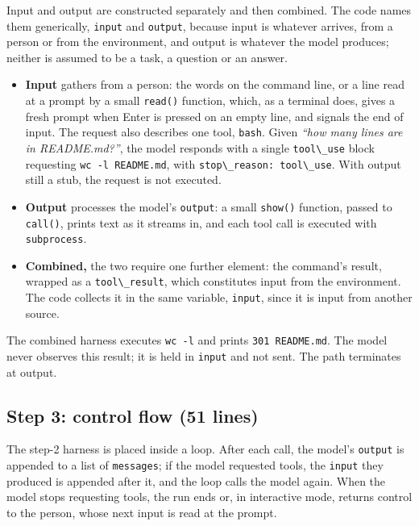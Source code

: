 Input and output are constructed separately and then combined. The code names them generically, \passthrough{\lstinline!input!} and \passthrough{\lstinline!output!}, because input is whatever arrives, from a person or from the environment, and output is whatever the model produces; neither is assumed to be a task, a question or an answer.

\begin{itemize}
\tightlist
\item
  \textbf{Input} gathers from a person: the words on the command line, or a line read at a prompt by a small \passthrough{\lstinline!read()!} function, which, as a terminal does, gives a fresh prompt when Enter is pressed on an empty line, and signals the end of input. The request also describes one tool, \passthrough{\lstinline!bash!}. Given \emph{``how many lines are in README.md?''}, the model responds with a single \passthrough{\lstinline!tool\_use!} block requesting \passthrough{\lstinline!wc -l README.md!}, with \passthrough{\lstinline!stop\_reason: tool\_use!}. With output still a stub, the request is not executed.
\item
  \textbf{Output} processes the model's \passthrough{\lstinline!output!}: a small \passthrough{\lstinline!show()!} function, passed to \passthrough{\lstinline!call()!}, prints text as it streams in, and each tool call is executed with \passthrough{\lstinline!subprocess!}.
\item
  \textbf{Combined,} the two require one further element: the command's result, wrapped as a \passthrough{\lstinline!tool\_result!}, which constitutes input from the environment. The code collects it in the same variable, \passthrough{\lstinline!input!}, since it is input from another source.
\end{itemize}

The combined harness executes \passthrough{\lstinline!wc -l!} and prints \passthrough{\lstinline!301 README.md!}. The model never observes this result; it is held in \passthrough{\lstinline!input!} and not sent. The path terminates at output.

\subsection{Step 3: control flow (51 lines)}

The step-2 harness is placed inside a loop. After each call, the model's \passthrough{\lstinline!output!} is appended to a list of \passthrough{\lstinline!messages!}; if the model requested tools, the \passthrough{\lstinline!input!} they produced is appended after it, and the loop calls the model again. When the model stops requesting tools, the run ends or, in interactive mode, returns control to the person, whose next input is read at the prompt.

